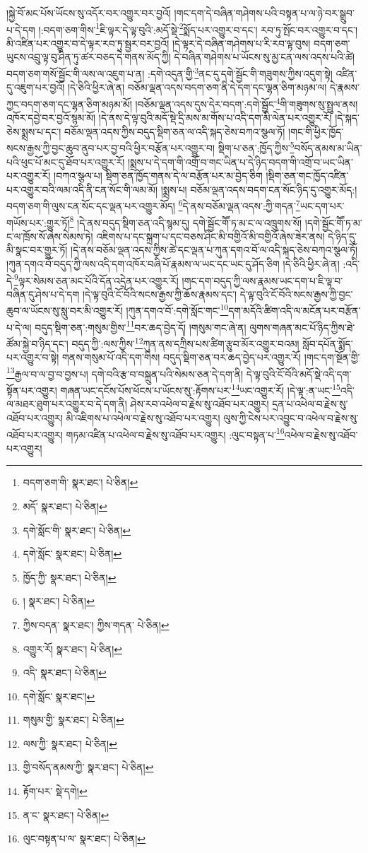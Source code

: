 །སྐྱེ་བོ་མང་པོས་ཡོངས་སུ་འདོར་བར་འགྱུར་བར་བྱའོ། །གང་དག་དེ་བཞིན་གཤེགས་པའི་བསྟན་པ་ལ་ཉེ་བར་སྒྲུབ་པ་དེ་དག །:བདག་ཅག་གིས་\footnote{བདག་ཅག་གི་  སྣར་ཐང་།  པེ་ཅིན། }ཇི་ལྟར་དེ་ལྟ་བུའི་:མདོ་སྡེ་\footnote{མདོ་  སྣར་ཐང་།  པེ་ཅིན། }སྨོད་པར་འགྱུར་བ་དང་། རབ་ཏུ་སྤོང་བར་འགྱུར་བ་དང་། མི་འཛིན་པར་འགྱུར་བ་དེ་ལྟར་རབ་ཏུ་སྦྱར་བར་བྱའོ། །དེ་ལྟར་དེ་བཞིན་གཤེགས་པ་རི་རབ་ལྟ་བུས། བདག་ཅག་ཡུངས་འབྲུ་ལྟ་བུ་ཤིན་ཏུ་ཚར་བཅད་དེ་གནས་མོད་ཀྱི། དེ་བཞིན་གཤེགས་པ་ཡོངས་སུ་མྱ་ངན་ལས་འདས་པའི་ཚེ། བདག་ཅག་གསོ་སྦྱོང་གི་ལས་ལ་འཇུག་པ་ན། :དགེ་འདུན་གྱི་\footnote{དགེ་སློང་གི་  སྣར་ཐང་།  པེ་ཅིན། }ནང་དུ་དགེ་སྦྱོང་གི་གཟུགས་ཀྱིས་འདུག་སྟེ། འཛིན་དུ་འཇུག་པར་བྱའོ། །དེ་ཅིའི་ཕྱིར་ཞེ་ན། བཅོམ་ལྡན་འདས་བདག་ཅག་ནི་དེ་དག་དང་ལྷན་ཅིག་མཉམ་ལ། དེ་རྣམས་ཀྱང་བདག་ཅག་དང་ལྷན་ཅིག་མཉམ་མོ། །བཅོམ་ལྡན་འདས་དུས་དེར་བདག་:དགེ་སྦྱོང་\footnote{དགེ་སློང་  སྣར་ཐང་།  པེ་ཅིན། }གི་གཟུགས་སུ་སྤྲུལ་ནས། འཁོར་དབྱེ་བར་བྱའོ་སྙམ་མོ། །དེ་ནས་དེ་ལྟ་བུའི་མདོ་སྡེ་དྲི་མས་མ་གོས་པ་འདི་དག་མི་ལེན་པར་འགྱུར་རོ། །དེ་སྐད་ཅེས་སྨྲས་པ་དང་། བཅོམ་ལྡན་འདས་ཀྱིས་བདུད་སྡིག་ཅན་ལ་འདི་སྐད་ཅེས་བཀའ་སྩལ་ཏོ། །གང་གི་ཕྱིར་ཁྱོད་སངས་རྒྱས་ཀྱི་བྱང་ཆུབ་ནུབ་པར་བྱ་བའི་ཕྱིར་བརྩོན་པར་འགྱུར་བ། སྡིག་པ་ཅན་:ཁྱོད་ཀྱིས་\footnote{ཁྱོད་ཀྱི་  སྣར་ཐང་།  པེ་ཅིན། }བསོད་ནམས་མ་ཡིན་པའི་ཕུང་པོ་མང་དུ་ཐོབ་པར་འགྱུར་རོ། །སྨྲས་པ་དེ་དག་གི་འགྲོ་བ་གང་ཡིན་པ་དེ་ཉིད་བདག་གི་འགྲོ་བ་ཡང་ཡིན་པར་འགྱུར་རོ། །བཀའ་སྩལ་པ། སྡིག་ཅན་ཁྱོད་གནས་དེ་ལ་བརྩོན་པར་མ་བྱེད་ཅིག །སྡིག་ཅན་གང་ཁྱོད་འཛིན་པར་འགྱུར་བའི་ལམ་འདི་ནི་ངན་སོང་གི་ལམ་མོ། །སྨྲས་པ། བཅོམ་ལྡན་འདས་བདག་ངན་སོང་ཉིད་དུ་འགྱུར་མོད:། བདག་ཅག་གི་ལུས་ངན་སོང་དང་ལྡན་པར་འགྱུར་མོད། \footnote{།    སྣར་ཐང་།  པེ་ཅིན། }དེ་ནས་བཅོམ་ལྡན་འདས་:ཀྱི་གདན་\footnote{ཀྱིས་བདན་  སྣར་ཐང་། ཀྱིས་གདན་  པེ་ཅིན། }ཡང་དག་པར་གཡོས་པར་:གྱུར་ཏོ།\footnote{འགྱུར་རོ།  སྣར་ཐང་།  པེ་ཅིན། } །དེ་ནས་བདུད་སྡིག་ཅན་འདི་སྙམ་དུ། དགེ་སྦྱོང་གཽ་ཏ་མ་ང་ལ་འཁྲུགས་སོ། །དགེ་སྦྱོང་གཽ་ཏ་མ་ང་ལ་ཁྲོས་སོ་ཞེས་སེམས་ཏེ། འཇིགས་པ་དང་སྐྲག་པ་དང་བཅས་ཤིང་མི་བགྱིའོ་མི་བགྱིའོ་ཞེས་ཟེར་ནས། དེ་ཉིད་དུ་མི་སྣང་བར་གྱུར་ཏོ། །དེ་ནས་བཅོམ་ལྡན་འདས་ཀྱིས་ཚེ་དང་ལྡན་པ་ཀུན་དགའ་བོ་ལ་འདི་སྐད་ཅེས་བཀའ་སྩལ་ཏོ། །ཀུན་དགའ་བོ་བདུད་ཀྱི་ལས་འདི་དག་འཁོར་བཞི་པོ་རྣམས་ལ་ཡང་དང་ཡང་དུ་ཤོད་ཅིག །དེ་ཅིའི་ཕྱིར་ཞེ་ན། :འདི་དེ་\footnote{འདི་  སྣར་ཐང་།  པེ་ཅིན། }ལྟར་སེམས་ཅན་མང་པོའི་དོན་འདྲེན་པར་འགྱུར་རོ། །གང་དག་བདུད་ཀྱི་ལས་རྣམས་ཡང་དག་པ་ཇི་ལྟ་བ་བཞིན་དུ་ཤེས་པ་དེ་དག །དེ་ལྟ་བུའི་ངོ་བོའི་སངས་རྒྱས་ཀྱི་ཆོས་རྣམས་དང་། དེ་ལྟ་བུའི་ངོ་བོའི་སངས་རྒྱས་ཀྱི་བྱང་ཆུབ་ལ་ཡོངས་སུ་སླུ་བར་མི་འགྱུར་རོ། །ཀུན་དགའ་བོ་:དགེ་སློང་གང་\footnote{དགེ་སློང་  སྣར་ཐང་། }དག་མདོའི་ཚིག་འདི་ལ་མངོན་པར་བརྩོན་པ་དེ་ལ། བདུད་སྡིག་ཅན་:གསུམ་གྱིས་\footnote{གསུམ་གྱི་  སྣར་ཐང་།  པེ་ཅིན། }བར་ཆད་བྱེད་དོ། །གསུམ་གང་ཞེ་ན། ལུགས་གཞན་མང་པོ་ཉིད་ཀྱིས་ཐེ་ཚོམ་སྐྱེ་བ་ཉིད་དང་། བདུད་ཀྱི་:ལས་ཀྱིས་\footnote{ལས་ཀྱི་  སྣར་ཐང་།  པེ་ཅིན། }ཀུན་ནས་དཀྲིས་པས་ཚིག་རྩུབ་མོར་འགྱུར་བའམ། སློབ་དཔོན་སྨོད་པར་འགྱུར་བ་སྟེ། གནས་གསུམ་པོ་འདི་དག་གིས། བདུད་སྡིག་ཅན་བར་ཆད་བྱེད་པར་འགྱུར་རོ། །གང་དག་སྔོན་གྱི་\footnote{གྱི་བསོད་ནམས་ཀྱི་  སྣར་ཐང་།  པེ་ཅིན། }རྒྱལ་བ་ལ་བྱ་བ་བྱས་པ། དགེ་བའི་རྩ་བ་བསྐྲུན་པའི་སེམས་ཅན་དེ་དག་ནི། དེ་ལྟ་བུའི་ངོ་བོའི་མདོ་སྡེ་འདི་དག་སྟོན་པར་འགྱུར། གཞན་ཡང་དངོས་པོས་ཕོངས་པ་ཡོངས་སུ་:རྟོགས་པར་\footnote{རྟོག་པར་  སྡེ་དགེ། }ཡང་འགྱུར་རོ། །དེ་ལྟ་:ན་ཡང་\footnote{ན་ང་  སྣར་ཐང་།  པེ་ཅིན། }འདི་ལ་མཐར་ཐུག་པར་འགྱུར་བ་དེ་དག་ནི། ཤེས་རབ་འཕེལ་བ་རྗེས་སུ་འཐོབ་པར་འགྱུར། དྲན་པ་འཕེལ་བ་རྗེས་སུ་འཐོབ་པར་འགྱུར། མི་འཇིགས་པ་འཕེལ་བ་རྗེས་སུ་འཐོབ་པར་འགྱུར། ལུས་ཀྱི་ངེས་པར་འབྱུང་བ་འཕེལ་བ་རྗེས་སུ་འཐོབ་པར་འགྱུར། གཏམ་འཛིན་པ་འཕེལ་བ་རྗེས་སུ་འཐོབ་པར་འགྱུར། :ལུང་བསྟན་པ་\footnote{ལུང་བསྟན་པ་ལ་  སྣར་ཐང་།  པེ་ཅིན། }འཕེལ་བ་རྗེས་སུ་འཐོབ་པར་འགྱུར། 